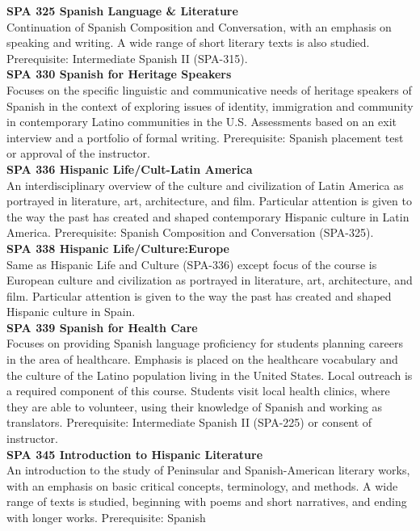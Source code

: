 \documentclass[
  letterpaper,
]{scrbook}
\begin{document}
\textbf{SPA 325 Spanish Language \& Literature}\\
Continuation of Spanish Composition and Conversation, with an emphasis
on speaking and writing. A wide range of short literary texts is also
studied. Prerequisite: Intermediate Spanish II (SPA-315).\\
\textbf{SPA 330 Spanish for Heritage Speakers}\\
Focuses on the specific linguistic and communicative needs of heritage
speakers of Spanish in the context of exploring issues of identity,
immigration and community in contemporary Latino communities in the U.S.
Assessments based on an exit interview and a portfolio of formal
writing. Prerequisite: Spanish placement test or approval of the
instructor.\\
\textbf{SPA 336 Hispanic Life/Cult-Latin America}\\
An interdisciplinary overview of the culture and civilization of Latin
America as portrayed in literature, art, architecture, and film.
Particular attention is given to the way the past has created and shaped
contemporary Hispanic culture in Latin America. Prerequisite: Spanish
Composition and Conversation (SPA-325).\\
\textbf{SPA 338 Hispanic Life/Culture:Europe}\\
Same as Hispanic Life and Culture (SPA-336) except focus of the course
is European culture and civilization as portrayed in literature, art,
architecture, and film. Particular attention is given to the way the
past has created and shaped Hispanic culture in Spain.\\
\textbf{SPA 339 Spanish for Health Care}\\
Focuses on providing Spanish language proficiency for students planning
careers in the area of healthcare. Emphasis is placed on the healthcare
vocabulary and the culture of the Latino population living in the United
States. Local outreach is a required component of this course. Students
visit local health clinics, where they are able to volunteer, using
their knowledge of Spanish and working as translators. Prerequisite:
Intermediate Spanish II (SPA-225) or consent of instructor.\\
\textbf{SPA 345 Introduction to Hispanic Literature}\\
An introduction to the study of Peninsular and Spanish-American literary
works, with an emphasis on basic critical concepts, terminology, and
methods. A wide range of texts is studied, beginning with poems and
short narratives, and ending with longer works. Prerequisite: Spanish
\end{document}
